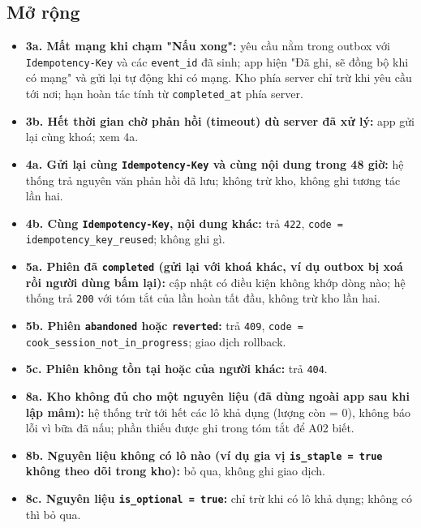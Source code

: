 \subsection{Mở rộng}
\begin{itemize}
\item \textbf{3a. Mất mạng khi chạm "Nấu xong":} yêu cầu nằm trong outbox với {\small\texttt{Idempotency-\allowbreak{}Key}} và các {\small\texttt{event\_\allowbreak{}\allowbreak{}id}} đã sinh; app hiện "Đã ghi, sẽ đồng bộ khi có mạng" và gửi lại tự động khi có mạng. Kho phía server chỉ trừ khi yêu cầu tới nơi; hạn hoàn tác tính từ {\small\texttt{completed\_\allowbreak{}\allowbreak{}at}} phía server.
\item \textbf{3b. Hết thời gian chờ phản hồi (timeout) dù server đã xử lý:} app gửi lại cùng khoá; xem 4a.
\item \textbf{4a. Gửi lại cùng {\small\texttt{Idempotency-\allowbreak{}Key}} và cùng nội dung trong 48 giờ:} hệ thống trả nguyên văn phản hồi đã lưu; không trừ kho, không ghi tương tác lần hai.
\item \textbf{4b. Cùng {\small\texttt{Idempotency-\allowbreak{}Key}}, nội dung khác:} trả {\small\texttt{422}}, {\small\texttt{code = idempotency\_\allowbreak{}\allowbreak{}key\_\allowbreak{}\allowbreak{}reused}}; không ghi gì.
\item \textbf{5a. Phiên đã {\small\texttt{completed}} (gửi lại với khoá khác, ví dụ outbox bị xoá rồi người dùng bấm lại):} cập nhật có điều kiện không khớp dòng nào; hệ thống trả {\small\texttt{200}} với tóm tắt của lần hoàn tất đầu, không trừ kho lần hai.
\item \textbf{5b. Phiên {\small\texttt{abandoned}} hoặc {\small\texttt{reverted}}:} trả {\small\texttt{409}}, {\small\texttt{code = cook\_\allowbreak{}\allowbreak{}session\_\allowbreak{}\allowbreak{}not\_\allowbreak{}\allowbreak{}in\_\allowbreak{}\allowbreak{}progress}}; giao dịch rollback.
\item \textbf{5c. Phiên không tồn tại hoặc của người khác:} trả {\small\texttt{404}}.
\item \textbf{8a. Kho không đủ cho một nguyên liệu (đã dùng ngoài app sau khi lập mâm):} hệ thống trừ tới hết các lô khả dụng (lượng còn = 0), không báo lỗi vì bữa đã nấu; phần thiếu được ghi trong tóm tắt để A02 biết.
\item \textbf{8b. Nguyên liệu không có lô nào (ví dụ gia vị {\small\texttt{is\_\allowbreak{}\allowbreak{}staple = true}} không theo dõi trong kho):} bỏ qua, không ghi giao dịch.
\item \textbf{8c. Nguyên liệu {\small\texttt{is\_\allowbreak{}\allowbreak{}optional = true}}:} chỉ trừ khi có lô khả dụng; không có thì bỏ qua.

\end{itemize}
